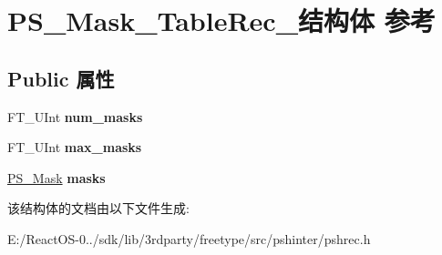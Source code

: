 \hypertarget{struct_p_s___mask___table_rec__}{}\section{P\+S\+\_\+\+Mask\+\_\+\+Table\+Rec\+\_\+结构体 参考}
\label{struct_p_s___mask___table_rec__}
\subsection*{Public 属性}
\begin{DoxyCompactItemize}
\item 
\mbox{\label{struct_p_s___mask___table_rec___a361f81947db638b79253b98f6ceb63b6}} 
F\+T\+\_\+\+U\+Int {\bfseries num\+\_\+masks}
\item 
\mbox{\label{struct_p_s___mask___table_rec___a837b778444df6b1a316d781668db3f32}} 
F\+T\+\_\+\+U\+Int {\bfseries max\+\_\+masks}
\item 
\mbox{\label{struct_p_s___mask___table_rec___a20d596cfc59134e06fca6c1b0a030fb8}} 
\hyperlink{struct_p_s___mask_rec__}{P\+S\+\_\+\+Mask} {\bfseries masks}
\end{DoxyCompactItemize}


该结构体的文档由以下文件生成\+:\begin{DoxyCompactItemize}
\item 
E\+:/\+React\+O\+S-\/0../sdk/lib/3rdparty/freetype/src/pshinter/pshrec.\+h\end{DoxyCompactItemize}
